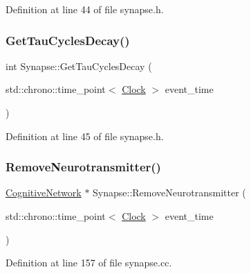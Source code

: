 Definition at line 44 of file synapse.\+h.

\mbox{\label{class_synapse_ab56dd60c4bb15a07faef144ec58bcee2}} 
\subsubsection{\texorpdfstring{Get\+Tau\+Cycles\+Decay()}{GetTauCyclesDecay()}}
{\footnotesize\ttfamily int Synapse\+::\+Get\+Tau\+Cycles\+Decay (\begin{DoxyParamCaption}\item[{std\+::chrono\+::time\+\_\+point$<$ \mbox{\hyperlink{universe_8h_a0ef8d951d1ca5ab3cfaf7ab4c7a6fd80}{Clock}} $>$}]{event\+\_\+time }\end{DoxyParamCaption})\hspace{0.3cm}{\ttfamily [inline]}}



Definition at line 45 of file synapse.\+h.

\mbox{\label{class_synapse_a29593ed2f05d60fcbf1db3e931ef5c53}} 
\subsubsection{\texorpdfstring{Remove\+Neurotransmitter()}{RemoveNeurotransmitter()}}
{\footnotesize\ttfamily \mbox{\hyperlink{class_cognitive_network}{Cognitive\+Network}} $\ast$ Synapse\+::\+Remove\+Neurotransmitter (\begin{DoxyParamCaption}\item[{std\+::chrono\+::time\+\_\+point$<$ \mbox{\hyperlink{universe_8h_a0ef8d951d1ca5ab3cfaf7ab4c7a6fd80}{Clock}} $>$}]{event\+\_\+time }\end{DoxyParamCaption})}



Definition at line 157 of file synapse.\+cc.

\mbox{\label{class_synapse_adcf623e56f90e07344537d71c0a5d51b}} 
